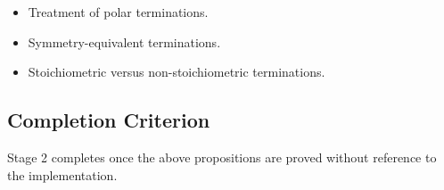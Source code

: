\begin{itemize}
\item Treatment of polar terminations.
\item Symmetry-equivalent terminations.
\item Stoichiometric versus non-stoichiometric terminations.
\end{itemize}

\subsection{Completion Criterion}

Stage 2 completes once the above propositions are proved without
reference to the implementation.
